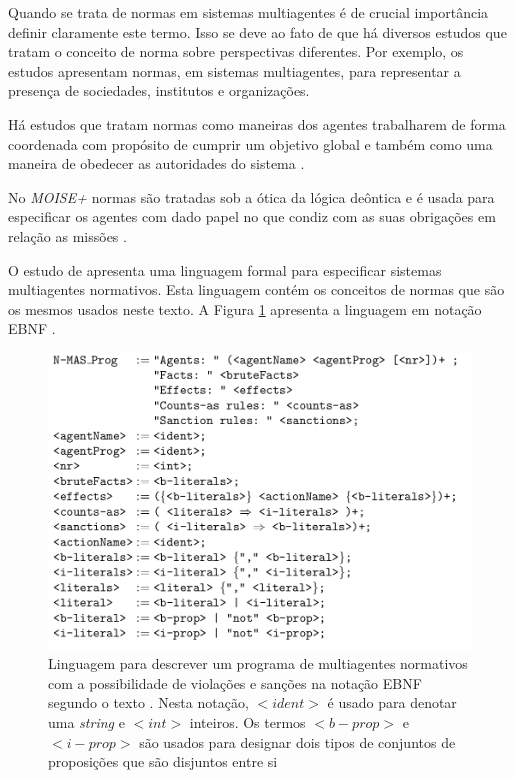 Quando se trata de normas em sistemas multiagentes é de crucial importância definir claramente este termo. Isso se deve ao fato de que há diversos estudos que tratam o conceito de norma sobre perspectivas diferentes. Por exemplo, os estudos \cite{formalizeagent,formalizeagent2} apresentam normas, em sistemas multiagentes, para representar a presença de sociedades, institutos e organizações. 

Há estudos que tratam normas como maneiras dos agentes trabalharem de forma coordenada com propósito de cumprir um objetivo global e também como uma maneira de obedecer as autoridades do sistema \cite{modelingnormsforautnomousagent,amodelmultiagentsystemdynamicrelationship}. 

No \textit{MOISE+} normas são tratadas sob a ótica da lógica deôntica e é usada para especificar os agentes com dado papel no que condiz com as suas obrigações em relação as missões \cite{moiseframework,moiseframeworktwo}.

O estudo de \cite{dastaniframework} apresenta uma linguagem formal para especificar sistemas multiagentes normativos. Esta linguagem contém os conceitos de normas que são os mesmos usados neste texto. A Figura \ref{descreveprograma} apresenta a linguagem em notação EBNF \cite{dastaniframework}.

\begin{figure}[H]
  \centering
  \includegraphics[width=0.8\linewidth]{figure/masprogram.png} 
  \caption{Linguagem para descrever um programa de multiagentes normativos com a possibilidade de violações e sanções na notação EBNF segundo o texto \cite{dastaniframework}. Nesta notação, $<ident>$ é usado para denotar uma \textit{string} e $<int>$ inteiros. Os termos $<b-prop>$ e $<i-prop>$ são usados para designar dois tipos de conjuntos de proposições que são disjuntos entre si}
  \label{descreveprograma}
\end{figure}

